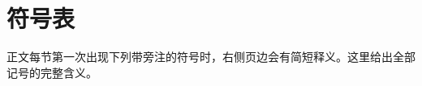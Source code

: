 \documentclass[UTF8,a4paper,11pt,fontset=none,oneside,openany]{ctexbook}
\begin{document}
\frontmatter
\thispagestyle{empty}
\vspace*{38mm}
\vspace{4mm}\noindent{\color{LaciaRule}\rule{\textwidth}{0.5pt}}
\newpage

\tableofcontents
\mainmatter

\appendix
\chapter{符号表}
正文每节第一次出现下列带旁注的符号时，右侧页边会有简短释义。这里给出全部记号的完整含义。
\LaciaSymbolTable
\end{document}
